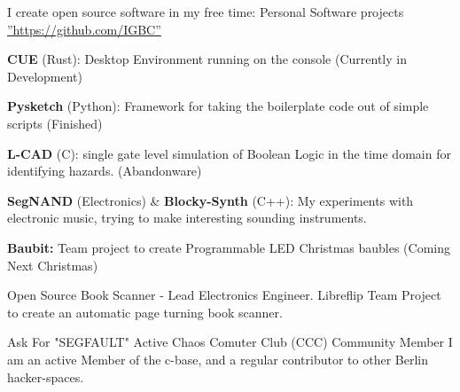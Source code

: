 \documentclass[11pt, a4paper]{awesome-cv}
\begin{document}
\begin{cventries}
  \cventry
    {I create open source software in my free time:} %
    {Personal Software projects} %
    {}{\hyperref[https://github.com/IGBC]{''https://github.com/IGBC''}} %
    {
    \begin{cvitems} %
        \item {\textbf{CUE} (Rust): Desktop Environment running on the console (Currently in Development)}
        \item {\textbf{Pysketch} (Python): Framework for taking the boilerplate code out of simple scripts (Finished)}
        \item {\textbf{L-CAD} (C): single gate level simulation of Boolean Logic in the time domain for identifying hazards. (Abandonware)}
        \item {\textbf{SegNAND} (Electronics) \& \textbf{Blocky-Synth} (C++): My experiments with electronic music, trying to make interesting sounding instruments.}
        \item {\textbf{Baubit:} Team project to create Programmable LED Christmas baubles (Coming Next Christmas)}
      \end{cvitems} 
     }

  \cventry
    {Open Source Book Scanner - Lead Electronics Engineer.} %
    {Libreflip} %
    {}{} %
    {Team Project to create an automatic page turning book scanner.}

  \cventry
    {Ask For "SEGFAULT"} %
    {Active Chaos Comuter Club (CCC) Community Member} %
    {}{} %
    {I am an active Member of the c-base, and a regular contributor to other Berlin hacker-spaces.}
\end{cventries}
\end{document}
